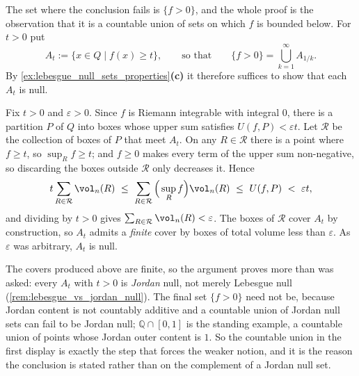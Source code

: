 \begin{exercisesolution}
\label{sol:vanishing_integral_forces_zero_ae}
The set where the conclusion fails is $\{f > 0\}$, and the whole proof is the observation that it
is a countable union of sets on which $f$ is bounded below. For $t > 0$ put
\[A_t := \{x \in Q \mid f(x) \geq t\}, \qquad\text{so that}\qquad
  \{f > 0\} = \bigcup_{k=1}^\infty A_{1/k}.\]
By \cref{ex:lebesgue_null_sets_properties}\textbf{(c)} it therefore suffices to show that each
$A_t$ is null.

Fix $t > 0$ and $\varepsilon > 0$. Since $f$ is Riemann integrable with integral $0$, there is a
partition $P$ of $Q$ into boxes whose upper sum satisfies $U(f,P) < \varepsilon t$. Let
$\mathcal{R}$ be the collection of boxes of $P$ that meet $A_t$. On any $R \in \mathcal{R}$ there
is a point where $f \geq t$, so $\sup_R f \geq t$; and $f \geq 0$ makes every term of the upper
sum non-negative, so discarding the boxes outside $\mathcal{R}$ only decreases it. Hence
\[t\sum_{R \in \mathcal{R}} \vol_n(R)
  \ \leq\ \sum_{R \in \mathcal{R}} \Big(\sup_R f\Big)\vol_n(R)
  \ \leq\ U(f,P) \ <\ \varepsilon t ,\]
and dividing by $t > 0$ gives $\sum_{R\in\mathcal{R}}\vol_n(R) < \varepsilon$. The boxes of
$\mathcal{R}$ cover $A_t$ by construction, so $A_t$ admits a \emph{finite} cover by boxes of
total volume less than $\varepsilon$. As $\varepsilon$ was arbitrary, $A_t$ is null.

\begin{remark}
The covers produced above are finite, so the argument proves more than was asked: every
$A_t$ with $t>0$ is \emph{Jordan} null, not merely Lebesgue null
(\cref{rem:lebesgue_vs_jordan_null}). The final set $\{f > 0\}$ need not be, because Jordan
content is not countably additive and a countable union of Jordan null sets can fail to be Jordan
null; $\mathbb{Q}\cap[0,1]$ is the standing example, a countable union of points whose Jordan
outer content is $1$. So the countable union in the first display is exactly the step that forces
the weaker notion, and it is the reason the conclusion is stated  rather
than on the complement of a Jordan null set.


\end{remark}
\end{exercisesolution}
